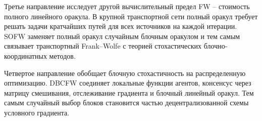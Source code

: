 Третье направление исследует другой вычислительный предел FW -- стоимость полного линейного
оракула.
В крупной транспортной сети полный оракул требует решать задачи кратчайших путей для всех
источников на каждой итерации.
SOFW заменяет полный оракул случайным блочным оракулом и тем самым связывает транспортный
Frank--Wolfe с теорией стохастических блочно-координатных методов.

Четвертое направление обобщает блочную стохастичность на распределенную оптимизацию.
DBCFW соединяет локальные функции агентов, консенсус через матрицу смешивания, отслеживание
градиента и блочный линейный оракул.
Тем самым случайный выбор блоков становится частью децентрализованной схемы условного
градиента.
